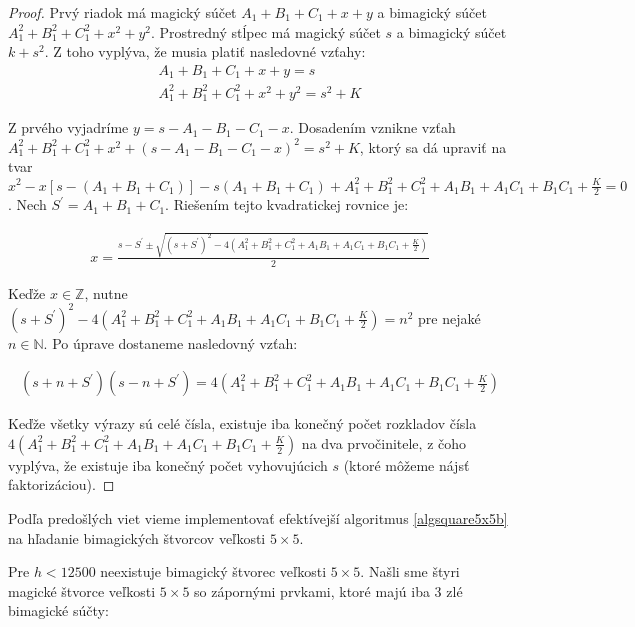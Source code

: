 \begin{proof} Prvý riadok má magický súčet $A_1 + B_1 + C_1 + x + y$ a bimagický súčet $A_1^2 + B_1^2 + C_1^2 + x^2 + y^2$. Prostredný stĺpec má magický súčet $s$ a bimagický súčet $k + s^2$. Z toho vyplýva, že musia platiť nasledovné vzťahy:
\begin{gather*}
A_1 + B_1 + C_1 + x + y = s \\
A_1^2 + B_1^2 + C_1^2 + x^2 + y^2 = s^2 + K
\end{gather*}

Z prvého vyjadríme $y = s - A_1 - B_1 - C_1 - x$. Dosadením vznikne vzťah $A_1^2 + B_1^2 + C_1^2 + x^2 + (s - A_1 - B_1 - C_1 - x)^2 = s^2 + K$, ktorý sa dá upraviť na tvar $x^2 - x[s - (A_1 + B_1 + C_1)] - s(A_1 + B_1 + C_1) + A_1^2 + B_1^2 + C_1^2 + A_1 B_1 + A_1 C_1 + B_1 C_1 + \frac{K}{2} = 0$. Nech $S^\prime = A_1 + B_1 + C_1$. Riešením tejto kvadratickej rovnice je:

\begin{gather*}
x = \frac{s - S^\prime \pm \sqrt{(s + S^\prime)^2 - 4(A_1^2 + B_1^2 + C_1^2 + A_1 B_1 + A_1 C_1 + B_1 C_1 + \frac{K}{2})}}{2}
\end{gather*}

Keďže $x \in \mathbb{Z}$, nutne $(s + S^\prime)^2 - 4(A_1^2 + B_1^2 + C_1^2 + A_1 B_1 + A_1 C_1 + B_1 C_1 + \frac{K}{2}) = n^2$ pre nejaké $n \in \mathbb{N}$. Po úprave dostaneme nasledovný vzťah:

\begin{gather*}
(s + n + S^\prime)(s - n + S^\prime) = 4(A_1^2 + B_1^2 + C_1^2 + A_1 B_1 + A_1 C_1 + B_1 C_1 + \frac{K}{2})
\end{gather*}

Keďže všetky výrazy sú celé čísla, existuje iba konečný počet rozkladov čísla $4(A_1^2 + B_1^2 + C_1^2 + A_1 B_1 + A_1 C_1 + B_1 C_1 + \frac{K}{2})$ na dva prvočinitele, z čoho vyplýva, že existuje iba konečný počet vyhovujúcich $s$ (ktoré môžeme nájsť faktorizáciou).
\end{proof}

Podľa predošlých viet vieme implementovať efektívejší algoritmus \ref{algsquare5x5b} na hľadanie bimagických štvorcov veľkosti $5 \times 5$. 

\begin{result} Pre $h < 12500$ neexistuje bimagický štvorec veľkosti $5 \times 5$. Našli sme štyri magické štvorce veľkosti $5 \times 5$ so zápornými prvkami, ktoré majú iba $3$ zlé bimagické súčty:
\end{result}


